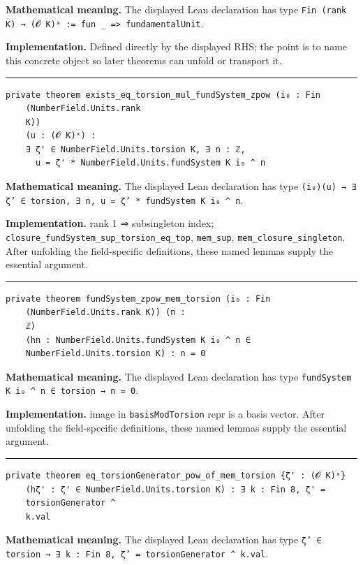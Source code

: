 \documentclass[UTF8,a4paper,11pt,fontset=fandol]{ctexart}
\theoremstyle{definition}
\newcommand{\statementsep}{\par\medskip\hrule\medskip}
\begin{document}
\noindent\textbf{Mathematical meaning.} The displayed Lean declaration has type \texttt{Fin (rank K) → (𝓞 K)ˣ := fun \_\allowbreak{} => fundamentalUnit}.\par
\noindent\textbf{Implementation.} Defined directly by the displayed RHS; the point is to name this concrete object so later theorems can unfold or transport it.\par
\statementsep
\begin{verbatim}
private theorem exists_eq_torsion_mul_fundSystem_zpow (i₀ : Fin
    (NumberField.Units.rank
    K))
    (u : (𝓞 K)ˣ) :
    ∃ ζ' ∈ NumberField.Units.torsion K, ∃ n : ℤ,
      u = ζ' * NumberField.Units.fundSystem K i₀ ^ n
\end{verbatim}
\noindent\textbf{Mathematical meaning.} The displayed Lean declaration has type \texttt{(i₀)(u) → ∃ ζ' ∈ torsion, ∃ n, u = ζ' * fundSystem K i₀ \textasciicircum{} n}.\par
\noindent\textbf{Implementation.} rank 1 ⇒ subsingleton index; \texttt{closure\_\allowbreak{}fundSystem\_\allowbreak{}sup\_\allowbreak{}torsion\_\allowbreak{}eq\_\allowbreak{}top}, \texttt{mem\_\allowbreak{}sup}, \texttt{mem\_\allowbreak{}closure\_\allowbreak{}singleton}. After unfolding the field-specific definitions, these named lemmas supply the essential argument.\par
\statementsep
\begin{verbatim}
private theorem fundSystem_zpow_mem_torsion (i₀ : Fin
    (NumberField.Units.rank K)) (n :
    ℤ)
    (hn : NumberField.Units.fundSystem K i₀ ^ n ∈
    NumberField.Units.torsion K) : n = 0
\end{verbatim}
\noindent\textbf{Mathematical meaning.} The displayed Lean declaration has type \texttt{fundSystem K i₀ \textasciicircum{} n ∈ torsion → n = 0}.\par
\noindent\textbf{Implementation.} image in \texttt{basisModTorsion} repr is a basis vector. After unfolding the field-specific definitions, these named lemmas supply the essential argument.\par
\statementsep
\begin{verbatim}
private theorem eq_torsionGenerator_pow_of_mem_torsion {ζ' : (𝓞 K)ˣ}
    (hζ' : ζ' ∈ NumberField.Units.torsion K) : ∃ k : Fin 8, ζ' =
    torsionGenerator ^
    k.val
\end{verbatim}
\noindent\textbf{Mathematical meaning.} The displayed Lean declaration has type \texttt{ζ' ∈ torsion → ∃ k : Fin 8, ζ' = torsionGenerator \textasciicircum{} k.\allowbreak{}val}.\par
\end{document}
